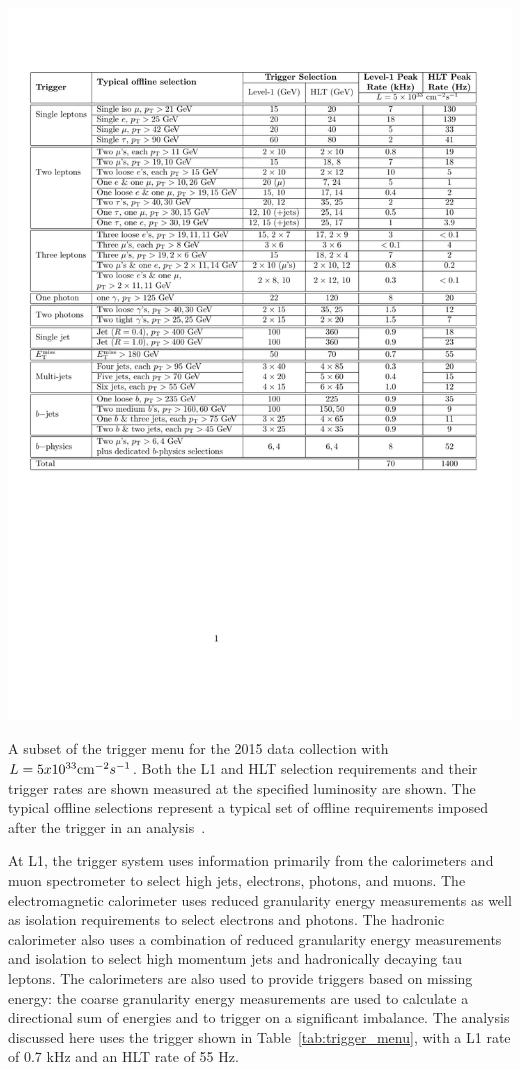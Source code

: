 \begin{table}[hbtp]
\centering
\includegraphics[width=\textwidth]{figures/trigger_menu.pdf}
\caption{A subset of the trigger menu for the 2015 data collection with $L = 5 x 10^{33}\mathrm{cm}^{-2}s^{-1}$. Both the \acs*{L1} and \acs*{HLT} selection requirements and their trigger rates are shown measured at the specified luminosity are shown. The typical offline selections represent a typical set of offline requirements imposed after the trigger in an analysis~\cite{ATL-DAQ-PUB-2016-001}.}
\label{tab:trigger_menu}
\end{table}

At \ac{L1}, the trigger system uses information primarily from the calorimeters and muon spectrometer to select high \pt jets, electrons, photons, and muons. 
The electromagnetic calorimeter uses reduced granularity energy measurements as well as isolation requirements to select electrons and photons.
The hadronic calorimeter also uses a combination of reduced granularity energy measurements and isolation to select high momentum jets and hadronically decaying tau leptons. 
The calorimeters are also used to provide triggers based on missing energy: the coarse granularity energy measurements are used to calculate a directional sum of energies and to trigger on a significant imbalance.
The analysis discussed here uses the \met trigger shown in Table~\ref{tab:trigger_menu}, with a \ac{L1} rate of 0.7 kHz and an \ac{HLT} rate of 55 Hz.

